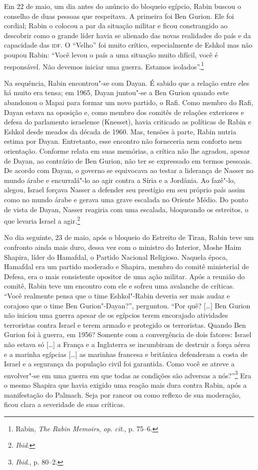 Em 22 de maio, um dia antes do anúncio do bloqueio egípcio, Rabin buscou
o conselho de duas pessoas que respeitava. A primeira foi Ben Gurion.
Ele foi cordial; Rabin o colocou a par da situação militar e ficou
constrangido ao descobrir como o grande líder havia se alienado das
novas realidades do país e da capacidade das \textsc{idf}. O ``Velho'' foi muito
crítico, especialmente de Eshkol mas não poupou Rabin: ``Você levou o
país a uma situação muito difícil, você é responsável. Não devemos
iniciar uma guerra. Estamos isolados''.\footnote{Rabin, \textit{The Rabin Memoirs},
\textit{op}. \textit{cit}., p. 75--6.}

Na sequência, Rabin encontrou"-se com Dayan. É sabido que a relação entre eles
há muito era tensa; em 1965, Dayan juntou"-se a Ben Gurion quando
este abandonou o Mapai para formar um novo partido, o Rafi. Como membro
do Rafi, Dayan estava na oposição e, como membro dos comitês de relações
exteriores e defesa do parlamento israelense (Knesset), havia criticado as políticas de Rabin e
Eshkol desde meados da década de 1960. Mas, tensões à parte, Rabin
nutria estima por Dayan. Entretanto, esse encontro não forneceria nem
conforto nem orientação. Conforme relata em suas memórias, a crítica não
lhe agradou, apesar de Dayan, ao contrário de Ben Gurion, não ter se
expressado em termos pessoais. De acordo com Dayan, o governo se
equivocava ao testar a liderança de Nasser no mundo árabe e encurralá"-lo
ao agir contra a Síria e a Jordânia. Ao fazê"-lo, alegou, Israel forçava
Nasser a defender seu prestígio em seu próprio país assim como no mundo
árabe e gerava uma grave escalada no Oriente Médio. Do ponto de vista de
Dayan, Nasser reagiria com uma escalada, bloqueando os estreitos, o que
levaria Israel a agir.\footnote{\textit{Ibid}.}

No dia seguinte, 23 de maio, após o bloqueio do Estreito de Tiran, Rabin teve
um confronto ainda mais duro, dessa vez com o ministro do Interior,
Moshe Haim Shapira, líder do Hamafdal, o Partido Nacional Religioso.
Naquela época, Hamafdal era um partido
moderado e Shapira, membro do comitê ministerial de Defesa, era o mais
consistente opositor de uma ação militar. Após a reunião do comitê, Rabin
teve um encontro com ele e sofreu uma avalanche de críticas. ``Você
realmente pensa que o time Eshkol"-Rabin deveria ser mais audaz e
corajoso que o time Ben Gurion"-Dayan?'', perguntou. ``Por quê? {[}\ldots{}{]} Ben
Gurion não iniciou uma guerra apesar de os egípcios terem encorajado
atividades terroristas contra Israel e terem armado e protegido os
terroristas. Quando Ben Gurion foi à guerra, em 1956? Somente com a
convergência de dois fatores: Israel não estava só {[}\ldots{}{]} a França e a
Inglaterra se incumbiram de destruir a força aérea e a marinha
egípcias {[}\ldots{}{]} as marinhas francesa e britânica defenderam a costa de Israel
e a segurança da população civil foi garantida. Como você se atreve a
envolver"-se em uma guerra em que todas as condições são adversas a
nós?''\footnote{\textit{Ibid}., p. 80--2.} Era o mesmo Shapira que havia exigido uma reação mais
dura contra Rabin, após a manifestação do Palmach. Seja por rancor ou
como reflexo de sua moderação, ficou clara a severidade de suas
críticas.

